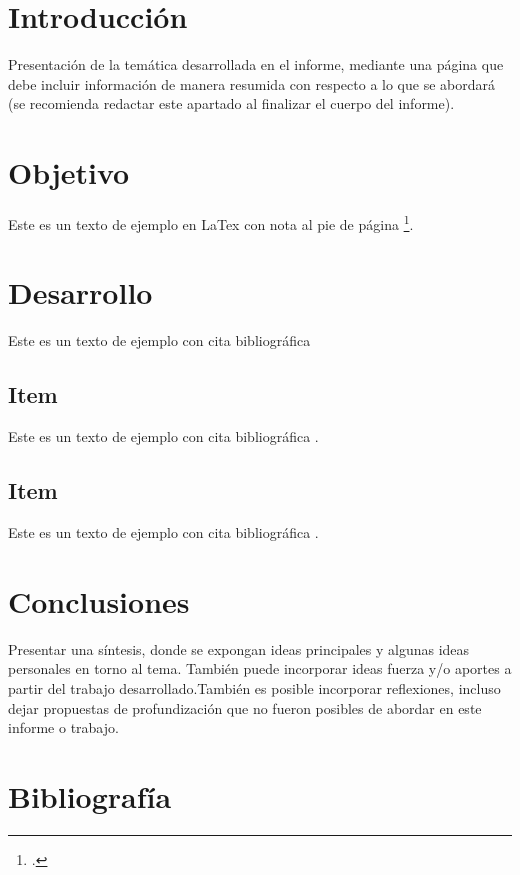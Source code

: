 \documentclass[a4paper, 11pt]{article}
\begin{document}
    \AddToShipoutPictureBG{\color{red}
        \AtPageLowerLeft{\rule{\paperwidth}{1cm}}
    }

    
    \tableofcontents
    \clearpage

    
    \section{Introducción}
    Presentación de la temática desarrollada en el informe, mediante una página que debe incluir información de manera resumida con respecto a lo que se abordará (se recomienda redactar este apartado al finalizar el cuerpo del informe).
    \clearpage
    
    
    \section{Objetivo}
    Este es un texto de ejemplo en LaTex con nota al pie de página \footcite{latexcompanion}.

    \section{Desarrollo}
    Este es un texto de ejemplo con cita bibliográfica \parencite{latexcompanion}

    \subsection{Item}
    Este es un texto de ejemplo con cita bibliográfica \parencite{knuthwebsite}.

    \subsection{Item}
    Este es un texto de ejemplo con cita bibliográfica \parencite{einstein}.
    \clearpage

    \section{Conclusiones}
    Presentar una síntesis, donde se expongan ideas principales y algunas ideas personales en torno al tema. También puede incorporar ideas fuerza y/o aportes a partir del trabajo desarrollado.También es posible incorporar reflexiones, incluso dejar propuestas de profundización que no fueron posibles de abordar en este informe o trabajo.
    \clearpage

    \section{Bibliografía}
    \printbibliography[title = Referencias]
\end{document}
